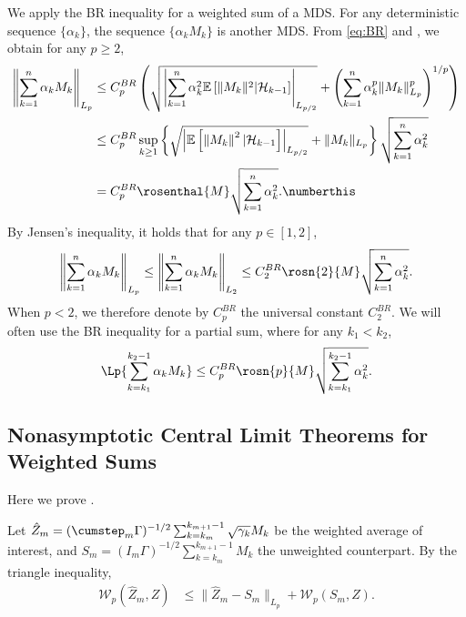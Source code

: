 \documentclass[11pt]{article}
\begin{document}
We apply the BR inequality for a weighted sum of a MDS. 
For any deterministic sequence $\{\alpha_k\}$, the sequence $\{\alpha_k M_k\}$ is another MDS.
From \eqref{eq:BR} and , we obtain for any $p \geq 2$,
\begin{align*}
    \left\lVert  
    \sum_{k=1}^n \alpha_k M_k
    \right\rVert_{L_p}
    &\leq 
    C_p^{BR} \left(
    \sqrt{\left\lvert \sum_{k=1}^n \alpha_k^2 \mathbb{E}\left[\lVert M_k \rVert^2 | \mathcal{H}_{k-1} \right] \right\rvert_{L_{p/2}}}
    + 
    \left(\sum_{k=1}^n \alpha_k^p \lVert M_k \rVert_{L_p}^p
    \right)^{1/p}\right)
    \\ &
    \leq C_p^{BR}  \sup_{k \geq 1} \left\{ \sqrt{\left\lvert 
        \mathbb{E}\left[  \left\lVert M_k \right\rVert^2 | \mathcal{H}_{k-1} \right]
        \right\rvert_{L_{p/2 }}} + \lVert M_k \rVert_{L_p} \right\} \sqrt{\sum_{k=1}^n \alpha_k^2}
    \\ &
    = C_p^{BR} \rosenthal{M} \sqrt{\sum_{k=1}^n \alpha_k^2} . 
    \numberthis \label{eq:br_inequality}
\end{align*}
By Jensen's inequality, it holds that for any $p \in [1, 2]$,
\begin{equation}
    \left\lVert \sum_{k=1}^n \alpha_k M_k \right\rVert_{L_p} \leq \left\lVert \sum_{k=1}^n \alpha_k M_k \right\rVert_{L_2}
    \leq C_2^{BR} \rosn{2}{M} \sqrt{\sum_{k=1}^n \alpha_k^2} .
\end{equation}
When $p < 2$, we therefore denote by $C_p^{BR}$ the universal constant $C_2^{BR}$. 
We will often use the BR inequality for a partial sum, where for any $k_1 < k_2$, 
\begin{align*}
    \Lp{\sum_{k=k_1}^{k_2 - 1} \alpha_k M_k}
    \leq C_p^{BR} \rosn{p}{M} \sqrt{\sum_{k=k_1}^{k_2 - 1} \alpha_k^2} . 
\end{align*}














\subsection{Nonasymptotic Central Limit Theorems for Weighted Sums}\label{proof:martingale_clt_weighted}
Here we prove .


Let $\hat{Z}_m = (\cumstep_m \Gamma)^{-1/2}\sum_{k=k_m}^{k_{m+1} - 1} \sqrt{\gamma_k} M_k$ be the weighted average of interest, and $S_m = (I_m\Gamma)^{-1/2} \sum_{k=k_m}^{k_{m+1} - 1} M_k$ the unweighted counterpart.
By the triangle inequality, 
\begin{align*}
    \mathcal{W}_{p}(\hat{Z}_m, Z) 
    &\leq 
    \lVert \hat{Z}_m -  S_m\rVert_{L_{p}} +
    \mathcal{W}_{p} (S_m, Z) 
    .
\end{align*}
\end{document}
